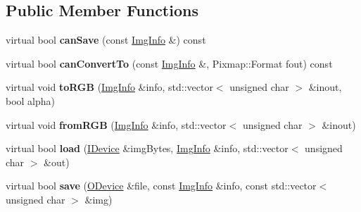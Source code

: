 \subsection*{Public Member Functions}
\begin{DoxyCompactItemize}
\item 
\hypertarget{class_tempest_1_1_image_codec_a261f66638aeced8e3f620b6f365cebbc}{virtual bool {\bfseries can\+Save} (const \hyperlink{struct_tempest_1_1_pixmap_1_1_img_info}{Img\+Info} \&) const }\label{class_tempest_1_1_image_codec_a261f66638aeced8e3f620b6f365cebbc}

\item 
\hypertarget{class_tempest_1_1_image_codec_a39bb950f18cec34627e0eee4f11fa9a2}{virtual bool {\bfseries can\+Convert\+To} (const \hyperlink{struct_tempest_1_1_pixmap_1_1_img_info}{Img\+Info} \&, Pixmap\+::\+Format fout) const }\label{class_tempest_1_1_image_codec_a39bb950f18cec34627e0eee4f11fa9a2}

\item 
\hypertarget{class_tempest_1_1_image_codec_a15f2dffe195ef4a0d91a778842f404b4}{virtual void {\bfseries to\+R\+G\+B} (\hyperlink{struct_tempest_1_1_pixmap_1_1_img_info}{Img\+Info} \&info, std\+::vector$<$ unsigned char $>$ \&inout, bool alpha)}\label{class_tempest_1_1_image_codec_a15f2dffe195ef4a0d91a778842f404b4}

\item 
\hypertarget{class_tempest_1_1_image_codec_a39693611734757d1631b9164227bbac0}{virtual void {\bfseries from\+R\+G\+B} (\hyperlink{struct_tempest_1_1_pixmap_1_1_img_info}{Img\+Info} \&info, std\+::vector$<$ unsigned char $>$ \&inout)}\label{class_tempest_1_1_image_codec_a39693611734757d1631b9164227bbac0}

\item 
\hypertarget{class_tempest_1_1_image_codec_ab6e62bd073a749f77ecf568a21d2b3f1}{virtual bool {\bfseries load} (\hyperlink{class_tempest_1_1_i_device}{I\+Device} \&img\+Bytes, \hyperlink{struct_tempest_1_1_pixmap_1_1_img_info}{Img\+Info} \&info, std\+::vector$<$ unsigned char $>$ \&out)}\label{class_tempest_1_1_image_codec_ab6e62bd073a749f77ecf568a21d2b3f1}

\item 
\hypertarget{class_tempest_1_1_image_codec_a1497e6829f9f1fddaa1267d487cde493}{virtual bool {\bfseries save} (\hyperlink{class_tempest_1_1_o_device}{O\+Device} \&file, const \hyperlink{struct_tempest_1_1_pixmap_1_1_img_info}{Img\+Info} \&info, const std\+::vector$<$ unsigned char $>$ \&img)}\label{class_tempest_1_1_image_codec_a1497e6829f9f1fddaa1267d487cde493}

\end{DoxyCompactItemize}
